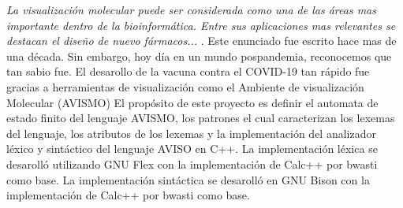 \textit{La visualización molecular puede ser considerada como una de las áreas mas importante dentro de la bioinformática. Entre sus aplicaciones mas relevantes se destacan el diseño de nuevo fármacos...} \cite{narciso_farias_gramatica_2012}.
Este enunciado fue escrito hace mas de una década. Sin embargo, hoy día en un mundo pospandemia, reconocemos que tan sabio fue.
El desarollo de la vacuna contra el COVID-19 tan rápido fue gracias a herramientas de visualización como el Ambiente de visualización Molecular (AVISMO) \cite{narciso_farias_gramatica_2012}
El propósito de este proyecto es definir el automata de estado finito del lenguaje AVISMO, los patrones el cual caracterizan los lexemas del lenguaje, los atributos de los lexemas y la implementación del analizador léxico y sintáctico del lenguaje AVISO en C++.
La implementación léxica se desarolló utilizando GNU Flex \cite{noauthor_flex_nodate} con la implementación de Calc++ por bwasti \cite{wasti_bwastibison-example-calc-_2020} como base.
La implementación sintáctica se desarolló en GNU Bison \cite{noauthor_bison_nodate} con la implementación de Calc++ por bwasti \cite{wasti_bwastibison-example-calc-_2020} como base.

